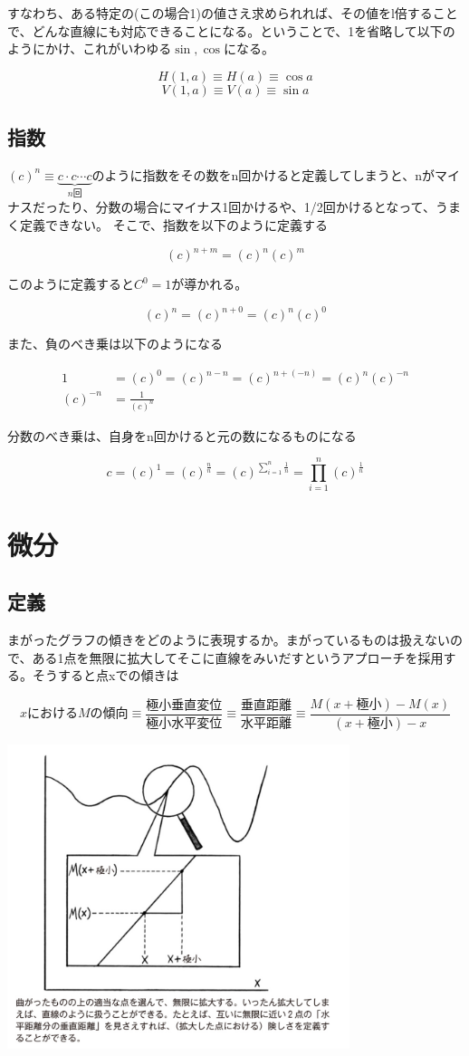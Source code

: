 \documentclass[dvipdfmx]{jsarticle}
\begin{document}
すなわち、ある特定の(この場合1)の値さえ求められれば、その値をl倍することで、どんな直線にも対応できることになる。ということで、1を省略して以下のようにかけ、これがいわゆる$\sin, \cos$になる。

\[ H(1,a) \equiv H(a) \equiv \cos a \]
\[ V(1,a) \equiv V(a) \equiv \sin a \]

\subsection{指数}

$(c)^n \equiv \underbrace{c \cdot c \cdots c}_{n回}$のように指数をその数をn回かけると定義してしまうと、nがマイナスだったり、分数の場合にマイナス1回かけるや、1/2回かけるとなって、うまく定義できない。 そこで、指数を以下のように定義する

\[(c)^{n+m} = (c)^n(c)^m \]

このように定義すると$C^0 = 1$が導かれる。

\[ (c)^n = (c)^{n+0} = (c)^n(c)^0 \]

また、負のべき乗は以下のようになる

\begin{align*}
1 &= (c)^0 = (c)^{n-n} = (c)^{n+(-n)} = (c)^n(c)^{-n} \\
(c)^{-n} &= \frac{1}{(c)^n}
\end{align*}

分数のべき乗は、自身をn回かけると元の数になるものになる

\[ c = (c)^1 = (c)^{\frac{n}{n}} = (c)^{\sum_{i=1}^{n}\frac{1}{n}} = \prod_{i=1}^{n}(c)^{\frac{1}{n}} \]

\section{微分}

\subsection{定義}
まがったグラフの傾きをどのように表現するか。まがっているものは扱えないので、ある1点を無限に拡大してそこに直線をみいだすというアプローチを採用する。そうすると点xでの傾きは

\[ xにおけるMの傾向 \equiv \frac{極小垂直変位}{極小水平変位} \equiv \frac{垂直距離}{水平距離} \equiv \frac{M(x+極小) - M(x)}{(x + 極小) -x } \]

  \includegraphics[width=10cm]{images/burn_math_2-1.png}
\end{document}
